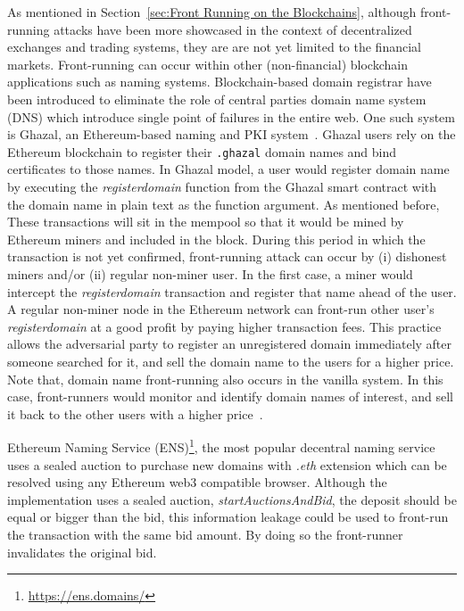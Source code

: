 
\noindent As mentioned in Section~\ref{sec:Front Running on the Blockchains}, although front-running attacks have been more showcased in the context of decentralized exchanges and trading systems, they are are not yet limited to the financial markets. Front-running can occur within other (non-financial) blockchain applications such as naming systems. Blockchain-based domain registrar have been introduced to eliminate the role of central parties \ie domain name system (DNS) which introduce single point of failures in the entire web. One such system is Ghazal, an Ethereum-based naming and PKI system~\cite{moosavighazal}. Ghazal users rely on the Ethereum blockchain to register their \texttt{.ghazal} domain names and bind certificates to those names. In Ghazal model, a user would register domain name by executing the \textit{registerdomain} function from the Ghazal smart contract with the domain name in plain text as the function argument. As mentioned before, These transactions will sit in the mempool so that it would be mined by Ethereum miners and included in the block. During this period in which the transaction is not yet confirmed, front-running attack can occur by (i) dishonest miners and/or (ii) regular non-miner user. In the first case, a miner would intercept the \textit{registerdomain} transaction and register that name ahead of the user. A regular non-miner node in the Ethereum network can front-run other user's \textit{registerdomain} at a good profit by paying higher transaction fees. This practice allows the adversarial party  to register an unregistered domain immediately after someone searched for it, and sell the domain name to the users for a higher price. Note that, domain name front-running also occurs in the vanilla system. In this case, front-runners would monitor and identify domain names of interest, and sell it back to the other users with a higher price~\cite{sac022en33:online}.


Ethereum Naming Service (ENS)\footnote{\url{https://ens.domains/}}, the most popular decentral naming service uses a sealed auction to purchase new domains with \textit{.eth} extension which can be resolved using any Ethereum web3 compatible browser. Although the implementation uses a sealed auction, \textit{startAuctionsAndBid}, the deposit should be equal or bigger than the bid, this information leakage could be used to front-run the transaction with the same bid amount. By doing so the front-runner invalidates the original bid.


